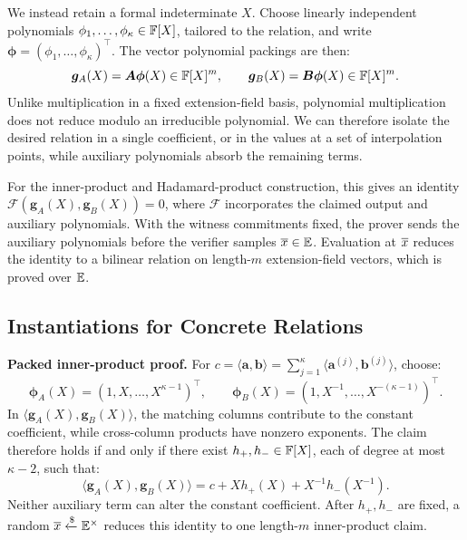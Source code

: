We instead retain a formal indeterminate \(X\).
Choose linearly independent polynomials
\(\phi_1,\ldots,\phi_\kappa\in{\mathbb{F}}[X]\), tailored to the
relation, and write
\(\bm\phi=(\phi_1,\ldots,\phi_\kappa)^\top\).
The vector polynomial packings are then:
\begin{equation}
    \bm g_A(X)=\bm A\bm\phi(X) \in{\mathbb{F}}[X]^m,
    \qquad
    \bm g_B(X)=\bm B\bm\phi(X)
       \in{\mathbb{F}}[X]^m.
\label{eq:overview-packing}
\end{equation}
Unlike multiplication in a fixed extension-field basis,
polynomial multiplication does not reduce modulo an
irreducible polynomial.
We can therefore isolate the desired relation in a single coefficient,
or in the values at a set of interpolation points, while auxiliary polynomials absorb the remaining terms.

For the inner-product and Hadamard-product construction, this gives an identity
\(\mathcal F(\bm g_A(X),\bm g_B(X))=0\), where
\(\mathcal F\) incorporates the claimed output and auxiliary
polynomials.
With the witness commitments fixed, the prover sends the auxiliary
polynomials before the verifier samples \(\overline{x}\in\mathbb{E}\).
Evaluation at \(\overline{x}\) reduces the identity to a bilinear
relation on length-\(m\) extension-field vectors, which is proved over \(\mathbb{E}\).

\subsection{Instantiations for Concrete Relations}

\medskip\noindent\textbf{Packed inner-product proof.}
For \(c=\langle\bm a,\bm b\rangle
=\sum_{j=1}^{\kappa}\langle\bm a^{(j)},\bm b^{(j)}\rangle\),
choose:
\[
    \bm\phi_A(X)=(1,X,\ldots,X^{\kappa-1})^\top,
    \qquad
    \bm\phi_B(X)=(1,X^{-1},\ldots,X^{-(\kappa-1)})^\top.
\]
In \(\langle\bm g_A(X),\bm g_B(X)\rangle\), the matching
columns contribute to the constant coefficient, while
cross-column products have nonzero exponents.
The claim therefore holds if and only if there exist
\(h_+,h_-\in{\mathbb{F}}[X]\), each of degree at most
\(\kappa-2\), such that:
\[
    \langle\bm g_A(X),\bm g_B(X)\rangle
       =c+Xh_+(X)+X^{-1}h_-(X^{-1}).
\]
Neither auxiliary term can alter the constant coefficient.
After \(h_+,h_-\) are fixed, a random
\(\overline{x}\mathrel{\xleftarrow{\$}}\mathbb{E}^\times\) reduces this identity
to one length-\(m\) inner-product claim.

